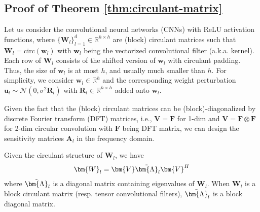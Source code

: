 \documentclass[journal]{IEEEtran} %
\def\vu{{\bm{u}}}
\def\vw{{\bm{w}}}
\def\mA{{\bm{A}}}
\def\mF{{\bm{F}}}
\def\mR{{\bm{R}}}
\def\mV{{\bm{V}}}
\def\mW{{\bm{W}}}
\def\mLambda{{\bm{\Lambda}}}
\newcommand{\R}{\mathbb{R}}
\begin{document}
\subsection{Proof of Theorem \ref{thm:circulant-matrix}}
\label{proof:circulant-matrix}
Let us consider the convolutional neural networks (CNNs) with ReLU activation functions, where $\{\mW_l\}_{l=1}^d \in \R^{h \times h}$ are (block) circulant matrices such that $\mW_l = \mathrm{circ}(\vw_l)$ with $\vw_l$ being the vectorized convolutional filter (a.k.a. kernel). Each row of $\mW_l$ consists of the shifted version of $\vw_l$ with circulant padding. Thus, the size of $\vw_l$ is at most $h$, and usually much smaller than $h$. For simplicity, we consider $\vw_l \in \R^h$ and the corresponding weight perturbation $\vu_l \sim \mathcal{N}(0,\sigma^2 \mR_l)$ with $\mR_l \in \R^{h \times h}$ added onto $\vw_l$.

Given the fact that the (block) circulant matrices can be (block)-diagonalized by discrete Fourier transform (DFT) matrices, i.e., $\mV=\mF$ for 1-dim and $\mV=\mF \otimes \mF$ for 2-dim circular convolution with $\mF$ being DFT matrix, we can design the sensitivity matrices $\mA_l$ in the frequency domain. 

Given the circulant structure of $\mW_l$, we have
\begin{align}
    \mW_l = \mV \Tilde{\mLambda}_l \mV^H
\end{align}
where $\Tilde{\mLambda}_l$ is a diagonal matrix containing eigenvalues of $\mW_l$. When $\mW_l$ is a block circulant matrix (resp. tensor convolutional filters), $\Tilde{\mLambda}_l$ is a block diagonal matrix.
\end{document}

